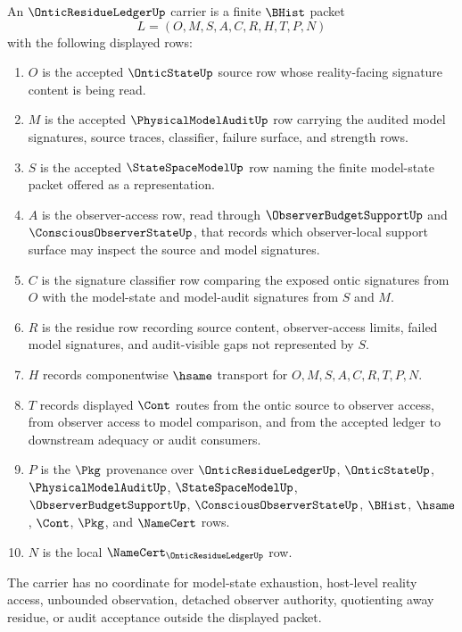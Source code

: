 \begin{definition}
\label{def:ontic-residue-ledger-carrier}
An $\OnticResidueLedgerUp$ carrier is a finite $\BHist$ packet
$$
L=(O,M,S,A,C,R,H,T,P,N)
$$
with the following displayed rows:
\begin{enumerate}
\item $O$ is the accepted $\OnticStateUp$ source row whose reality-facing signature content is being read.
\item $M$ is the accepted $\PhysicalModelAuditUp$ row carrying the audited model signatures, source traces, classifier, failure surface, and strength rows.
\item $S$ is the accepted $\StateSpaceModelUp$ row naming the finite model-state packet offered as a representation.
\item $A$ is the observer-access row, read through $\ObserverBudgetSupportUp$ and $\ConsciousObserverStateUp$, that records which observer-local support surface may inspect the source and model signatures.
\item $C$ is the signature classifier row comparing the exposed ontic signatures from $O$ with the model-state and model-audit signatures from $S$ and $M$.
\item $R$ is the residue row recording source content, observer-access limits, failed model signatures, and audit-visible gaps not represented by $S$.
\item $H$ records componentwise $\hsame$ transport for $O,M,S,A,C,R,T,P,N$.
\item $T$ records displayed $\Cont$ routes from the ontic source to observer access, from observer access to model comparison, and from the accepted ledger to downstream adequacy or audit consumers.
\item $P$ is the $\Pkg$ provenance over $\OnticResidueLedgerUp$, $\OnticStateUp$, $\PhysicalModelAuditUp$, $\StateSpaceModelUp$, $\ObserverBudgetSupportUp$, $\ConsciousObserverStateUp$, $\BHist$, $\hsame$, $\Cont$, $\Pkg$, and $\NameCert$ rows.
\item $N$ is the local $\NameCert_{\OnticResidueLedgerUp}$ row.
\end{enumerate}
The carrier has no coordinate for model-state exhaustion, host-level reality access, unbounded observation, detached observer authority, quotienting away residue, or audit acceptance outside the displayed packet.
\end{definition}

